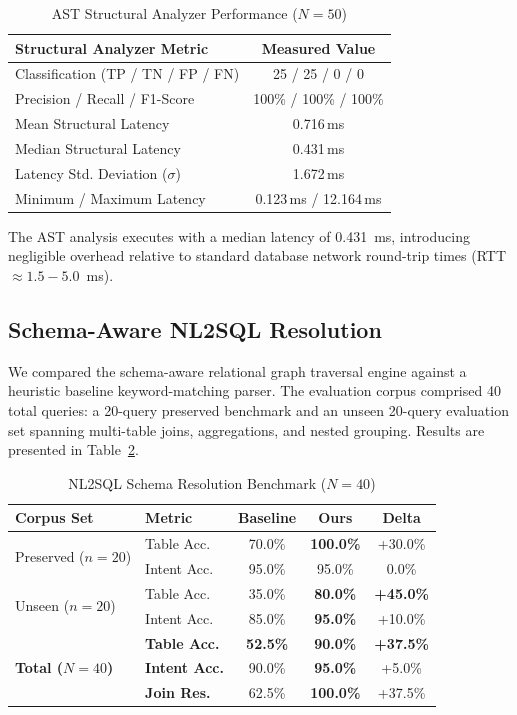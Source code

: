\documentclass[conference]{IEEEtran}
\begin{document}
\begin{table}[t]
\caption{AST Structural Analyzer Performance ($N=50$)}
\label{tab:ast_stats}
\centering
\footnotesize
\renewcommand{\arraystretch}{1.12}
\begin{tabularx}{\columnwidth}{@{} X c @{}}
\toprule
\textbf{Structural Analyzer Metric} & \textbf{Measured Value} \\
\midrule
Classification (TP / TN / FP / FN) & 25 / 25 / 0 / 0 \\
Precision / Recall / F1-Score & 100\% / 100\% / 100\% \\
Mean Structural Latency & 0.716\,ms \\
Median Structural Latency & 0.431\,ms \\
Latency Std. Deviation ($\sigma$) & 1.672\,ms \\
Minimum / Maximum Latency & 0.123\,ms / 12.164\,ms \\
\bottomrule
\end{tabularx}
\end{table}

The AST analysis executes with a median latency of 0.431~ms, introducing negligible overhead relative to standard database network round-trip times (RTT $\approx 1.5 - 5.0$~ms).

\subsection{Schema-Aware NL2SQL Resolution}
We compared the schema-aware relational graph traversal engine against a heuristic baseline keyword-matching parser. The evaluation corpus comprised 40 total queries: a 20-query preserved benchmark and an unseen 20-query evaluation set spanning multi-table joins, aggregations, and nested grouping. Results are presented in Table~\ref{tab:nl2sql_results}.

\begin{table}[t]
\caption{NL2SQL Schema Resolution Benchmark ($N=40$)}
\label{tab:nl2sql_results}
\centering
\footnotesize
\renewcommand{\arraystretch}{1.12}
\begin{tabularx}{\columnwidth}{@{} p{2.2cm} l c c c @{}}
\toprule
\textbf{Corpus Set} & \textbf{Metric} & \textbf{Baseline} & \textbf{Ours} & \textbf{Delta} \\
\midrule
\multirow{2}{*}{Preserved ($n=20$)} & Table Acc. & 70.0\% & \textbf{100.0\%} & +30.0\% \\
& Intent Acc. & 95.0\% & 95.0\% & 0.0\% \\
\midrule
\multirow{2}{*}{Unseen ($n=20$)} & Table Acc. & 35.0\% & \textbf{80.0\%} & \textbf{+45.0\%} \\
& Intent Acc. & 85.0\% & \textbf{95.0\%} & +10.0\% \\
\midrule
\multirow{3}{*}{\textbf{Total ($N=40$)}} & \textbf{Table Acc.} & \textbf{52.5\%} & \textbf{90.0\%} & \textbf{+37.5\%} \\
& \textbf{Intent Acc.} & 90.0\% & \textbf{95.0\%} & +5.0\% \\
& \textbf{Join Res.} & 62.5\% & \textbf{100.0\%} & +37.5\% \\
\bottomrule
\end{tabularx}
\end{table}
\end{document}
